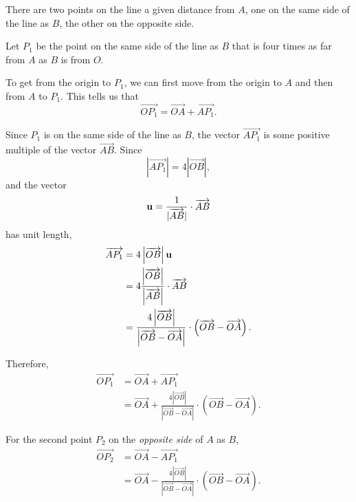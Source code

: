 \documentclass{ximera}
\begin{document}
\begin{explanation}

There are two points on the line a given distance from $A$, one on the same side of the line as $B$, the other on the opposite side.

Let $P_1$ be the point on the same side of the line as $B$ that is four times as far from $A$ as $B$ is from $O$.

To get from the origin to $P_1$, we can first move from the origin to $A$ and then from $A$ to $P_1$. This tells us that
\[
      \overrightarrow{OP_1} = \overrightarrow{OA} +\overrightarrow{AP_1}.
\]

Since $P_1$ is on the same side of the line as $B$, the vector $\overrightarrow{AP_1}$ is some positive multiple of the vector $\overrightarrow{AB}$. Since 
\[
         \left|  \overrightarrow{AP_1}   \right| = 4 \left| \overrightarrow{OB}  \right| ,
\]
and the vector
\[
      {\bf u} =  \frac{1}{|\overrightarrow{AB}|} \cdot \overrightarrow{AB}
\]
has unit length,
\begin{align*}
       \overrightarrow{AP_1} &= 4\left| \overrightarrow{OB}  \right|  {\bf u}  \\
                                         & = 4 \frac{\left| \overrightarrow{OB}\right|}{\left| \overrightarrow{AB}\right|}\cdot \overrightarrow{AB} \\
                                        &= \frac{4 \left| \overrightarrow{OB}\right|}{\left| \overrightarrow{OB} -\overrightarrow{OA} \right|}\cdot \left( \overrightarrow{OB} - \overrightarrow{OA} \right) .
\end{align*}

Therefore,
\begin{align*}
                 \overrightarrow{OP_1} &= \overrightarrow{OA} +\overrightarrow{AP_1} \\
                                                  &= \overrightarrow{OA} +  \frac{4 \left| \overrightarrow{OB}\right|}{\left| \overrightarrow{OB} -\overrightarrow{OA} \right|}\cdot \left( \overrightarrow{OB} - \overrightarrow{OA} \right) .
\end{align*}

For the second point $P_2$ on the \emph{opposite side} of $A$ as $B$, 
\begin{align*}
                 \overrightarrow{OP_2} &= \overrightarrow{OA} -\overrightarrow{AP_1} \\
                                                   &= \overrightarrow{OA} - \frac{4 \left| \overrightarrow{OB}\right|}{\left| \overrightarrow{OB} -\overrightarrow{OA} \right|}\cdot \left( \overrightarrow{OB} - \overrightarrow{OA} \right) .
\end{align*}

\end{explanation}
\end{document}
